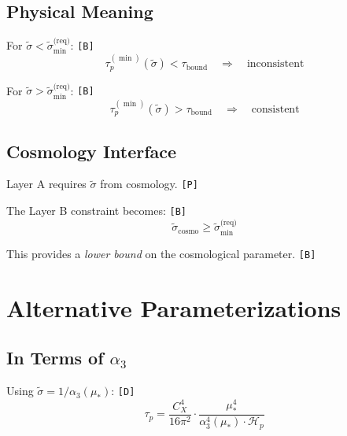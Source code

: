 \documentclass[11pt,a4paper]{article}
\newcommand{\tagD}{\textcolor{green!50!black}{\texttt{[D]}}}
\newcommand{\tagP}{\textcolor{orange!80!black}{\texttt{[P]}}}
\newcommand{\tagB}{\textcolor{purple!70!black}{\texttt{[B]}}}
\theoremstyle{definition}
\begin{document}
\subsection{Physical Meaning}
\label{subsec:physical}

For $\tilde{\sigma} < \tilde{\sigma}_{\min}^{\text{(req)}}$: \tagB{}
\begin{equation}
\label{eq:phys-excluded}
\tau_p^{(\min)}(\tilde{\sigma}) < \tau_{\text{bound}} \quad \Rightarrow \quad \text{inconsistent}
\end{equation}

For $\tilde{\sigma} > \tilde{\sigma}_{\min}^{\text{(req)}}$: \tagB{}
\begin{equation}
\label{eq:phys-allowed}
\tau_p^{(\min)}(\tilde{\sigma}) > \tau_{\text{bound}} \quad \Rightarrow \quad \text{consistent}
\end{equation}

\subsection{Cosmology Interface}
\label{subsec:cosmo-interface}

Layer A requires $\tilde{\sigma}$ from cosmology. \tagP{}

The Layer B constraint becomes: \tagB{}
\begin{equation}
\label{eq:cosmo-constraint}
\tilde{\sigma}_{\text{cosmo}} \geq \tilde{\sigma}_{\min}^{\text{(req)}}
\end{equation}

This provides a \emph{lower bound} on the cosmological parameter. \tagB{}

\section{Alternative Parameterizations}
\label{sec:alt-param}

\subsection{In Terms of $\alpha_3$}
\label{subsec:alpha3-param}

Using $\tilde{\sigma} = 1/\alpha_3(\mu_*)$: \tagD{}
\begin{equation}
\label{eq:alt-alpha3}
\tau_p = \frac{C_X^4}{16\pi^2} \cdot \frac{\mu_*^4}{\alpha_3^4(\mu_*) \cdot \mathcal{H}_p}
\end{equation}
\end{document}
